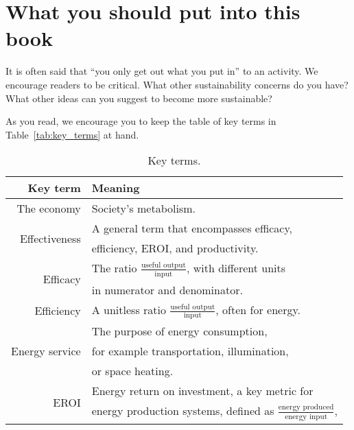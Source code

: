 {%
\section*{What you should put into this book} 

It is often said that ``you only get out what you put in'' to an activity.
We encourage readers to be critical.
What other sustainability concerns do you have?
What other ideas can you suggest to become more sustainable?

As you read, we encourage you to keep the table of key terms in Table~\ref{tab:key_terms} at hand.

\begin{table}[h!]
\caption{Key terms.}
\centering
\begin{tabular}{r l}
\toprule
Key term              & Meaning  \\ 
\midrule  
The economy           & Society's metabolism. \vspace{4mm} \\
%
\multirow{2}{*}{Effectiveness}  & A general term that encompasses efficacy, \\
                                & efficiency, EROI, and productivity. \vspace{4mm} \\
%
\multirow{2}{*}{Efficacy}   & The ratio $\frac{\text{useful output}}{\text{input}}$, with different units \\
                            & in numerator and denominator. \vspace{4mm} \\
%
Efficiency            & A unitless ratio $\frac{\text{useful output}}{\text{input}}$, often for energy. \vspace{4mm} \\
%
\multirow{3}{*}{Energy service}   & The purpose of energy consumption, \\
                                  & for example transportation, illumination, \\
                                  & or space heating. \vspace{4mm} \\
%
\multirow{3}{*}{EROI} & Energy return on investment, a key metric for \\
                      & energy production systems, defined as $\frac{\text{energy produced}}{\text{energy input}}$, \\

\end{tabular}
\end{table}}
